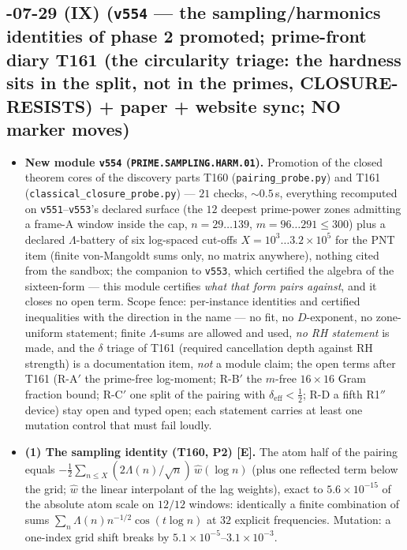 \documentclass[11pt]{article}
\providecommand{\mE}{\textbf{[E]}}\providecommand{\mC}{\textbf{[C]}}
\begin{document}
\subsection*{-07-29 (IX) (\texttt{v554} --- the sampling/harmonics identities of phase 2 promoted; prime-front diary T161 (the circularity triage: the hardness sits in the split, not in the primes, CLOSURE-RESISTS) + paper + website sync; NO marker moves)}
\begin{itemize}[leftmargin=1.5em]
\item \textbf{New module \texttt{v554} (\texttt{PRIME.SAMPLING.HARM.01}).} Promotion of
the closed theorem cores of the discovery parts T160 (\texttt{pairing\_probe.py}) and
T161 (\texttt{classical\_closure\_probe.py}) --- $21$ checks, ${\sim}0.5$\,s, everything
recomputed on \texttt{v551}--\texttt{v553}'s declared surface (the $12$ deepest
prime-power zones admitting a frame-A window inside the cap, $n=29\ldots139$,
$m=96\ldots291\le300$) plus a declared $\Lambda$-battery of six log-spaced cut-offs
$X=10^{3}\ldots3.2\times10^{5}$ for the PNT item (finite von-Mangoldt sums only, no
matrix anywhere), nothing cited from the sandbox; the companion to \texttt{v553}, which
certified the algebra of the sixteen-form --- this module certifies \emph{what that form
pairs against}, and it closes no open term. Scope fence: per-instance identities and
certified inequalities with the direction in the name --- no fit, no $D$-exponent, no
zone-uniform statement; finite $\Lambda$-sums are allowed and used, \emph{no RH
statement} is made, and the $\delta$ triage of T161 (required cancellation depth against
RH strength) is a documentation item, \emph{not} a module claim; the open terms after
T161 (R-A$'$ the prime-free log-moment; R-B$'$ the $m$-free $16\times16$ Gram fraction
bound; R-C$'$ one split of the pairing with $\delta_{\mathrm{eff}}<\tfrac12$; R-D a
fifth R1$''$ device) stay open and typed open; each statement carries at least one
mutation control that must fail loudly.
\item \textbf{(1) The sampling identity (T160, P2) \mE.} The atom half of the pairing
equals $-\tfrac12\sum_{n\le X}(2\Lambda(n)/\sqrt n)\,\widehat w(\log n)$ (plus one
reflected term below the grid; $\widehat w$ the linear interpolant of the lag weights),
exact to $5.6\times10^{-15}$ of the absolute atom scale on $12/12$ windows: identically
a finite combination of sums $\sum_n\Lambda(n)n^{-1/2}\cos(t\log n)$ at $32$ explicit
frequencies. Mutation: a one-index grid shift breaks by
$5.1\times10^{-5}$--$3.1\times10^{-3}$.

\end{itemize}
\end{document}
